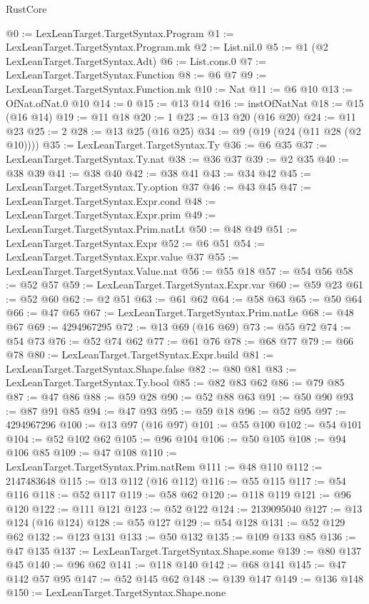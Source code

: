 \begin{lexlean}{RustCore}
\begin{coremodule}
@0 := LexLeanTarget.TargetSyntax.Program
@1 := LexLeanTarget.TargetSyntax.Program.mk
@2 := List.nil.{0}
@5 := @1 (@2 LexLeanTarget.TargetSyntax.Adt)
@6 := List.cons.{0}
@7 := LexLeanTarget.TargetSyntax.Function
@8 := @6 @7
@9 := LexLeanTarget.TargetSyntax.Function.mk
@10 := Nat
@11 := @6 @10
@13 := OfNat.ofNat.{0} @10
@14 := 0
@15 := @13 @14
@16 := instOfNatNat
@18 := @15 (@16 @14)
@19 := @11 @18
@20 := 1
@23 := @13 @20 (@16 @20)
@24 := @11 @23
@25 := 2
@28 := @13 @25 (@16 @25)
@34 := @9 (@19 (@24 (@11 @28 (@2 @10))))
@35 := LexLeanTarget.TargetSyntax.Ty
@36 := @6 @35
@37 := LexLeanTarget.TargetSyntax.Ty.nat
@38 := @36 @37
@39 := @2 @35
@40 := @38 @39
@41 := @38 @40
@42 := @38 @41
@43 := @34 @42
@45 := LexLeanTarget.TargetSyntax.Ty.option @37
@46 := @43 @45
@47 := LexLeanTarget.TargetSyntax.Expr.cond
@48 := LexLeanTarget.TargetSyntax.Expr.prim
@49 := LexLeanTarget.TargetSyntax.Prim.natLt
@50 := @48 @49
@51 := LexLeanTarget.TargetSyntax.Expr
@52 := @6 @51
@54 := LexLeanTarget.TargetSyntax.Expr.value @37
@55 := LexLeanTarget.TargetSyntax.Value.nat
@56 := @55 @18
@57 := @54 @56
@58 := @52 @57
@59 := LexLeanTarget.TargetSyntax.Expr.var
@60 := @59 @23
@61 := @52 @60
@62 := @2 @51
@63 := @61 @62
@64 := @58 @63
@65 := @50 @64
@66 := @47 @65
@67 := LexLeanTarget.TargetSyntax.Prim.natLe
@68 := @48 @67
@69 := 4294967295
@72 := @13 @69 (@16 @69)
@73 := @55 @72
@74 := @54 @73
@76 := @52 @74 @62
@77 := @61 @76
@78 := @68 @77
@79 := @66 @78
@80 := LexLeanTarget.TargetSyntax.Expr.build
@81 := LexLeanTarget.TargetSyntax.Shape.false
@82 := @80 @81
@83 := LexLeanTarget.TargetSyntax.Ty.bool
@85 := @82 @83 @62
@86 := @79 @85
@87 := @47 @86
@88 := @59 @28
@90 := @52 @88 @63
@91 := @50 @90
@93 := @87 @91 @85
@94 := @47 @93
@95 := @59 @18
@96 := @52 @95
@97 := 4294967296
@100 := @13 @97 (@16 @97)
@101 := @55 @100
@102 := @54 @101
@104 := @52 @102 @62
@105 := @96 @104
@106 := @50 @105
@108 := @94 @106 @85
@109 := @47 @108
@110 := LexLeanTarget.TargetSyntax.Prim.natRem
@111 := @48 @110
@112 := 2147483648
@115 := @13 @112 (@16 @112)
@116 := @55 @115
@117 := @54 @116
@118 := @52 @117
@119 := @58 @62
@120 := @118 @119
@121 := @96 @120
@122 := @111 @121
@123 := @52 @122
@124 := 2139095040
@127 := @13 @124 (@16 @124)
@128 := @55 @127
@129 := @54 @128
@131 := @52 @129 @62
@132 := @123 @131
@133 := @50 @132
@135 := @109 @133 @85
@136 := @47 @135
@137 := LexLeanTarget.TargetSyntax.Shape.some
@139 := @80 @137 @45
@140 := @96 @62
@141 := @118 @140
@142 := @68 @141
@145 := @47 @142 @57 @95
@147 := @52 @145 @62
@148 := @139 @147
@149 := @136 @148
@150 := LexLeanTarget.TargetSyntax.Shape.none

\end{coremodule}
\end{lexlean}
